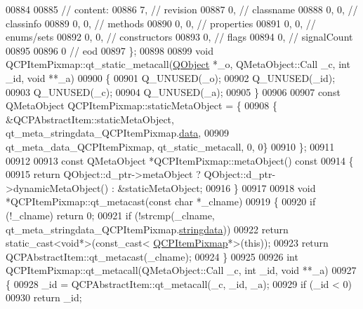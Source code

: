 \begin{DoxyCode}
00884 
00885  \textcolor{comment}{// content:}
00886        7,       \textcolor{comment}{// revision}
00887        0,       \textcolor{comment}{// classname}
00888        0,    0, \textcolor{comment}{// classinfo}
00889        0,    0, \textcolor{comment}{// methods}
00890        0,    0, \textcolor{comment}{// properties}
00891        0,    0, \textcolor{comment}{// enums/sets}
00892        0,    0, \textcolor{comment}{// constructors}
00893        0,       \textcolor{comment}{// flags}
00894        0,       \textcolor{comment}{// signalCount}
00895 
00896        0        \textcolor{comment}{// eod}
00897 \};
00898 
00899 \textcolor{keywordtype}{void} QCPItemPixmap::qt\_static\_metacall(\hyperlink{a00059}{QObject} *\_o, QMetaObject::Call \_c, \textcolor{keywordtype}{int} \_id, \textcolor{keywordtype}{void} **\_a)
00900 \{
00901     Q\_UNUSED(\_o);
00902     Q\_UNUSED(\_id);
00903     Q\_UNUSED(\_c);
00904     Q\_UNUSED(\_a);
00905 \}
00906 
00907 \textcolor{keyword}{const} QMetaObject QCPItemPixmap::staticMetaObject = \{
00908     \{ &QCPAbstractItem::staticMetaObject, qt\_meta\_stringdata\_QCPItemPixmap.\hyperlink{a00067_ac2c2965eddf58c85d34bd6a8bc3608fe}{data},
00909       qt\_meta\_data\_QCPItemPixmap,  qt\_static\_metacall, 0, 0\}
00910 \};
00911 
00912 
00913 \textcolor{keyword}{const} QMetaObject *QCPItemPixmap::metaObject()\textcolor{keyword}{ const}
00914 \textcolor{keyword}{}\{
00915     \textcolor{keywordflow}{return} QObject::d\_ptr->metaObject ? QObject::d\_ptr->dynamicMetaObject() : &staticMetaObject;
00916 \}
00917 
00918 \textcolor{keywordtype}{void} *QCPItemPixmap::qt\_metacast(\textcolor{keyword}{const} \textcolor{keywordtype}{char} *\_clname)
00919 \{
00920     \textcolor{keywordflow}{if} (!\_clname) \textcolor{keywordflow}{return} 0;
00921     \textcolor{keywordflow}{if} (!strcmp(\_clname, qt\_meta\_stringdata\_QCPItemPixmap.\hyperlink{a00067_a4cee80f7af4fafbb06fc161890ced10e}{stringdata}))
00922         \textcolor{keywordflow}{return} \textcolor{keyword}{static\_cast<}\textcolor{keywordtype}{void}*\textcolor{keyword}{>}(\textcolor{keyword}{const\_cast<} \hyperlink{a00037}{QCPItemPixmap}*\textcolor{keyword}{>}(\textcolor{keyword}{this}));
00923     \textcolor{keywordflow}{return} QCPAbstractItem::qt\_metacast(\_clname);
00924 \}
00925 
00926 \textcolor{keywordtype}{int} QCPItemPixmap::qt\_metacall(QMetaObject::Call \_c, \textcolor{keywordtype}{int} \_id, \textcolor{keywordtype}{void} **\_a)
00927 \{
00928     \_id = QCPAbstractItem::qt\_metacall(\_c, \_id, \_a);
00929     \textcolor{keywordflow}{if} (\_id < 0)
00930         \textcolor{keywordflow}{return} \_id;

\end{DoxyCode}

